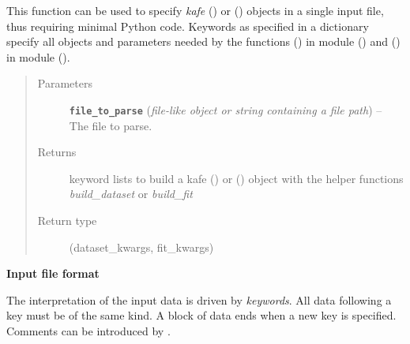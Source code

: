 \documentclass[a4paper,10pt,english]{sphinxmanual}
\begin{document}

\begin{fulllineitems}
\label{module_doc:kafe.file_tools.parse_general_inputfile}
This function can be used to specify \emph{kafe}
{\hyperref[module_doc:kafe.dataset.Dataset]{\emph{}}} () or {\hyperref[module_doc:kafe.fit.Fit]{\emph{}}} () objects
in a single input file, thus requiring minimal Python code. Keywords as
specified in a dictionary  specify all objects and parameters
needed by the functions {\hyperref[module_doc:kafe.dataset_tools.build_dataset]{\emph{}}} () in
module {\hyperref[module_doc:module-kafe.dataset]{\emph{}}} () and {\hyperref[module_doc:kafe.fit.build_fit]{\emph{}}} () in
module {\hyperref[module_doc:module-kafe.fit]{\emph{}}} ().
\begin{quote}\begin{description}
\item[{Parameters}] \leavevmode
\textbf{\texttt{file\_to\_parse}} (\emph{file-like object or string containing a file path}) -- The file to parse.

\item[{Returns}] \leavevmode
keyword lists to build a kafe {\hyperref[module_doc:kafe.dataset.Dataset]{\emph{}}} () or
{\hyperref[module_doc:kafe.fit.Fit]{\emph{}}} () object with the helper functions
\emph{build\_dataset} or \emph{build\_fit}

\item[{Return type}] \leavevmode
(dataset\_kwargs, fit\_kwargs)

\end{description}\end{quote}

\textbf{Input file format}

The interpretation of the input data is driven by \emph{keywords}. All data
following a key must be of the same kind. A block of data ends when a
new key is specified. Comments can be introduced by \code{\#}.


\end{fulllineitems}
\end{document}
